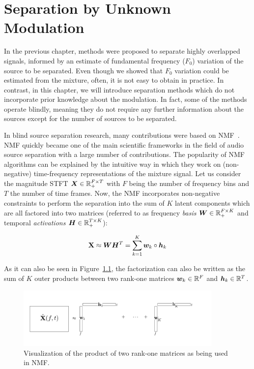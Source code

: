 \chapter{Separation by Unknown Modulation}
\label{cha:unknown}

In the previous chapter, methods were proposed to separate highly overlapped signals, informed by an estimate of fundamental frequency (\(F_0\)) variation of the source to be separated.
Even though we showed that \(F_0\) variation could be estimated from the mixture, often, it is not easy to obtain in practice.
In contrast, in this chapter, we will introduce separation methods which do not incorporate prior knowledge about the modulation. 
In fact, some of the methods operate blindly, meaning they do not require any further information about the sources except for the number of sources to be separated.
\par
In blind source separation research, many contributions were based on \ac{NMF}~\cite{lee99, lee01}.
\acs{NMF} quickly became one of the main scientific frameworks in the field of audio source separation with a large number of contributions.
The popularity of \acs{NMF} algorithms can be explained by the intuitive way in which they work on (non-negative) time-frequency representations of the mixture signal.
Let us consider the magnitude \acs{STFT} \({\bm{X}} \in {\mathbb{R}}_{+}^{F \times T}\) with \(F\) being the number of frequency bins and \(T\) the number of time frames.
Now, the \acs{NMF} incorporates non-negative constraints to perform the separation into the sum of \(K\) latent components which are all factored into two matrices (referred to as frequency \emph{basis} \({\bm{W}} \in {\mathbb{R}}_{+}^ { F \times K }\) and temporal \emph{activations} \({\bm{H}} \in {\mathbb{R}}_{+}^ { T \times K }\)):

\begin{equation}
  \mathbf{X} \approx {\bm{W}} {\bm{H}}^{T} = \sum\limits_{k=1}^{K} {\bm{w}}_{k} \circ {\bm{h}}_{k}
  \label{eq:vanilla_nmf}
\end{equation}

As it can also be seen in Figure~\ref{fig:nmf}, the factorization can also be written as the sum of \(K\) outer products between two rank-one matrices \({\bm{w}}_k \in {\mathbb{R}}^F\) and \({\bm{h}}_k \in {\mathbb{R}}^T\).

\begin{figure}[ht]
  \centering
  \includegraphics[width=0.9\textwidth]{Chapters/06_Separation_Unknown/figures/nmf.pdf}
  \caption{Visualization of the product of two rank-one matrices as being used in \ac{NMF}.}
  \label{fig:nmf}
\end{figure}

